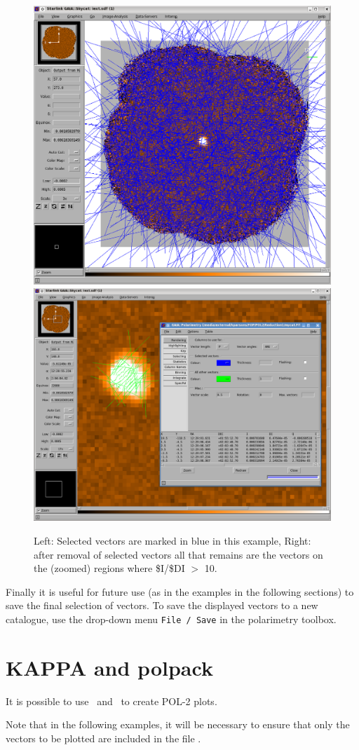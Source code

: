 \begin{figure}[t!]
\begin{center}
\includegraphics[width=0.44\linewidth]{sc22-gaia-plot-vectors-5.png}
\includegraphics[width=0.52\linewidth]{sc22-gaia-plot-vectors-7.png}
\caption [Over Plotting Vectors in GAIA]{ Left: Selected vectors are
  marked in blue in this example, Right: after removal of selected
  vectors all that remains are the vectors on the (zoomed) regions
  where \$I/\$DI $>$ 10.}
\label{fig:gaiavectorsfinal}
\end{center}
\end{figure}


Finally it is useful for future use (as in the examples in the
following sections) to save the final selection of vectors. To save the
displayed vectors to a new catalogue, use the drop-down menu
\texttt{File / Save} in the polarimetry toolbox.

\section{KAPPA and polpack}

It is possible to use \Kappa\ and \polpack\ to create POL-2 plots.

\begin{terminalv}
\end{terminalv}

Note that in the following examples, it will be necessary to ensure
that only the vectors to be plotted are included in the file
.

